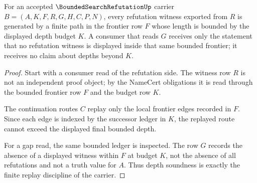 \begin{theorem}
\label{thm:bounded-search-refutation-depth-soundness}
For an accepted $\BoundedSearchRefutationUp$ carrier $B=(A,K,F,R,G,H,C,P,N)$, every refutation witness exported from $R$ is generated by a finite path in the frontier row $F$ whose length is bounded by the displayed depth budget $K$. A consumer that reads $G$ receives only the statement that no refutation witness is displayed inside that same bounded frontier; it receives no claim about depths beyond $K$.
\end{theorem}
\begin{proof}
Start with a consumer read of the refutation side. The witness row $R$ is not an independent proof object; by the NameCert obligations it is read through the bounded frontier row $F$ and the budget row $K$.

The continuation routes $C$ replay only the local frontier edges recorded in $F$. Since each edge is indexed by the successor ledger in $K$, the replayed route cannot exceed the displayed final bounded depth.

For a gap read, the same bounded ledger is inspected. The row $G$ records the absence of a displayed witness within $F$ at budget $K$, not the absence of all refutations and not a truth value for $A$. Thus depth soundness is exactly the finite replay discipline of the carrier.
\end{proof}

